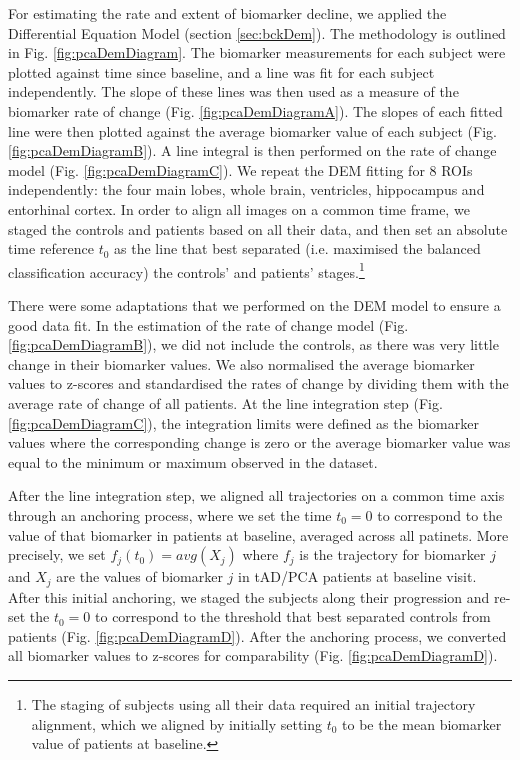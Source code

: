 For estimating the rate and extent of biomarker decline, we applied the Differential Equation Model \cite{villemagne2013amyloid, oxtoby2018} (section \ref{sec:bckDem}). The methodology is outlined in Fig. \ref{fig:pcaDemDiagram}. The biomarker measurements for each subject were plotted against time since baseline, and a line was fit for each subject independently. The slope of these lines was then used as a measure of the biomarker rate of change (Fig. \ref{fig:pcaDemDiagramA}). The slopes of each fitted line were then plotted against the average biomarker value of each subject (Fig. \ref{fig:pcaDemDiagramB}). A line integral is then performed on the rate of change model (Fig. \ref{fig:pcaDemDiagramC}).  We repeat the DEM fitting for 8 ROIs independently: the four main lobes, whole brain, ventricles, hippocampus and entorhinal cortex. In order to align all images on a common time frame, we staged the controls and patients based on all their data, and then set an absolute time reference $t_0$ as the line that best separated (i.e. maximised the balanced classification accuracy) the controls' and patients' stages.\footnote{The staging of subjects using all their data required an initial trajectory alignment, which we aligned by initially setting $t_0$ to be the mean biomarker value of patients at baseline.}

There were some adaptations that we performed on the DEM model to ensure a good data fit. In the estimation of the rate of change model (Fig. \ref{fig:pcaDemDiagramB}), we did not include the controls, as there was very little change in their biomarker values. We also normalised the average biomarker values to z-scores and standardised the rates of change by dividing them with the average rate of change of all patients. At the line integration step (Fig. \ref{fig:pcaDemDiagramC}), the integration limits were defined as the biomarker values where the corresponding change is zero or the average biomarker value was equal to the minimum or maximum observed in the dataset. 

After the line integration step, we aligned all trajectories on a common time axis through an anchoring process, where we set the time $t_0 = 0$ to correspond to the value of that biomarker in patients at baseline, averaged across all patinets. More precisely, we set $f_j(t_0) = avg(X_j)$ where $f_j$ is the trajectory for biomarker $j$ and $X_j$ are the values of biomarker $j$ in tAD/PCA patients at baseline visit. After this initial anchoring, we staged the subjects along their progression and re-set the $t_0 = 0$ to correspond to the threshold that best separated controls from patients (Fig. \ref{fig:pcaDemDiagramD}). After the anchoring process, we converted all biomarker values to z-scores for comparability (Fig. \ref{fig:pcaDemDiagramD}).

